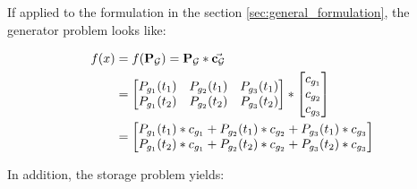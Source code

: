 If applied to the formulation in the section \ref{sec:general_formulation}, the generator problem looks like:

\begin{subequations}
	\begin{align}
		f(x) &= f(\vb{P_\mathcal{G}}) = \vb{P_\mathcal{G}} * \va{c_\mathcal{G}}\\
		& = \begin{bmatrix}
			P_{g_1}(t_1) & P_{g_2}(t_1) & P_{g_3}(t_1) \\
			P_{g_1}(t_2) & P_{g_2}(t_2) & P_{g_3}(t_2)
		\end{bmatrix} * \begin{bmatrix}
			c_{g_1} \\
			c_{g_2} \\
			c_{g_3}
		\end{bmatrix} \\
		& = \begin{bmatrix}
			P_{g_1}(t_1) * c_{g_1} + P_{g_2}(t_1) * c_{g_2} + P_{g_3}(t_1) * c_{g_3} \\
			P_{g_1}(t_2) * c_{g_1} + P_{g_2}(t_2) * c_{g_2} + P_{g_3}(t_2) * c_{g_3} \\
		\end{bmatrix}
	\end{align}
\end{subequations}

In addition, the storage problem yields:


